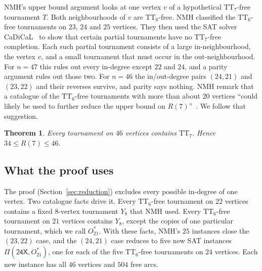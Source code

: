 \documentclass[11pt]{amsart}
\newtheorem{theorem}{Theorem}[section]
\theoremstyle{definition}
\theoremstyle{remark}
\newcommand{\TT}[1]{\mathrm{TT}_{#1}}
\newcommand{\Ostar}{O_{21}^{*}}
\newcommand{\cl}[1]{\textsf{#1}}
\newcommand{\Piv}[2]{\Pi(#1,#2)}
\begin{document}
NMH's upper bound argument looks at one vertex $v$ of a hypothetical
$\TT{7}$-free tournament $T$. Both neighbourhoods of $v$ are $\TT{6}$-free.
NMH classified the $\TT{6}$-free tournaments on $23$, $24$ and $25$ vertices.
They then used the SAT solver CaDiCaL~\cite{Bie18} to show that certain
partial tournaments have no $\TT{7}$-free completion. Each such partial
tournament consists of a large in-neighbourhood, the vertex $v$, and a small
tournament that must occur in the out-neighbourhood. For $n=47$ this rules out
every in-degree except $22$ and $24$, and a parity argument rules out those
two. For $n=46$ the in/out-degree pairs $(24,21)$ and $(23,22)$ and their
reverses survive, and parity says nothing. NMH remark that a catalogue of the
$\TT{6}$-free tournaments with more than about $20$ vertices ``could likely be
used to further reduce the upper bound on $R(7)$''~\cite[\S6]{NMH22}. We
follow that suggestion.

\begin{theorem}\label{thm:main}
Every tournament on $46$ vertices contains $\TT{7}$. Hence $34 \le R(7) \le 46$.
\end{theorem}

\subsection*{What the proof uses}
The proof (Section~\ref{sec:reduction}) excludes every possible in-degree of
one vertex. Two catalogue facts drive it. Every $\TT{6}$-free tournament on
$22$ vertices contains a fixed $8$-vertex tournament $Y_8$ that NMH used.
Every $\TT{6}$-free tournament on $21$ vertices contains $Y_8$, except the
copies of one particular tournament, which we call $\Ostar$. With these facts, NMH's $25$ instances close the
$(23,22)$ case, and the $(24,21)$ case reduces to five new SAT instances
$\Piv{\cl{24X}}{\Ostar}$, one for each of the five $\TT{6}$-free tournaments on
$24$ vertices. Each new instance has all $46$ vertices and $504$ free arcs.
\end{document}
